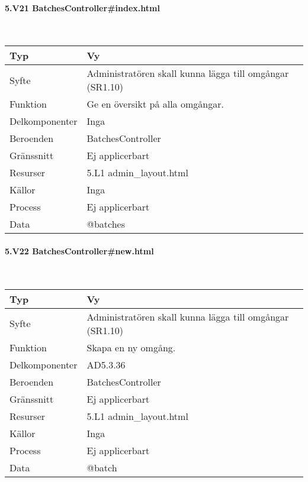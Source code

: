 \documentclass[a4paper, twoside, 11pt, titlepage]{article}
\begin{document}
			\paragraph{5.V21 BatchesController\#index.html}\

			\begin {table} [ht] \begin{tabular} {  p{3.5cm} p{9.6cm} }
				\hline
				{Typ} & {Vy} \\
				\hline
				{Syfte} & {Administratören skall kunna lägga till omgångar (SR1.10)} \\
				\hline
				{Funktion} & {Ge en översikt på alla omgångar.} \\
				\hline
				{Delkomponenter} & {Inga} \\
				\hline
				{Beroenden} & {BatchesController} \\
				\hline
				{Gränssnitt} & {Ej applicerbart} \\
				\hline
				{Resurser} & {5.L1 admin\_layout.html} \\
				\hline
				{Källor} & {Inga} \\
				\hline
				{Process} & {Ej applicerbart} \\
				\hline
				{Data} & {@batches} \\
				\hline
			\end{tabular} \end{table} \FloatBarrier


			\paragraph{5.V22 BatchesController\#new.html}\

			\begin {table} [ht] \begin{tabular} {  p{3.5cm} p{9.6cm} }
				\hline
				{Typ} & {Vy} \\
				\hline
				{Syfte} & {Administratören skall kunna lägga till omgångar (SR1.10)} \\
				\hline
				{Funktion} & {Skapa en ny omgång.} \\
				\hline
				{Delkomponenter} & {AD5.3.36} \\
				\hline
				{Beroenden} & {BatchesController} \\
				\hline
				{Gränssnitt} & {Ej applicerbart} \\
				\hline
				{Resurser} & {5.L1 admin\_layout.html} \\
				\hline
				{Källor} & {Inga} \\
				\hline
				{Process} & {Ej applicerbart} \\
				\hline
				{Data} & {@batch} \\
				\hline
			\end{tabular} \end{table} \FloatBarrier
\end{document}
